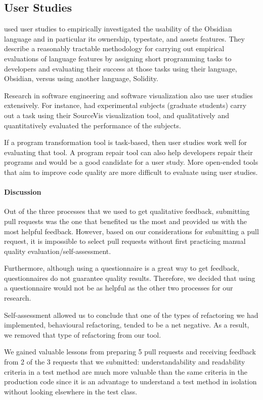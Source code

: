 \subsection{User Studies}
 used user studies to empirically
investigated the usability of the Obsidian language and in particular
its ownership, typestate, and assets features. They describe a
reasonably tractable methodology for carrying out empirical
evaluations of language features by assigning short programming tasks
to developers and evaluating their success at those tasks using their
language, Obsidian, versus using another language, Solidity.

Research in software engineering and software visualization also use
user studies extensively.  For instance,  had
experimental subjects (graduate students) carry out a task using their
SourceVis visualization tool, and qualitatively and quantitatively
evaluated the performance of the subjects.

If a program transformation tool is task-based, then user studies work
well for evaluating that tool. A program repair tool can also help developers
repair their programs and would be a good candidate for a user study.
More open-ended tools that aim to improve code quality are more difficult
to evaluate using user studies.

\paragraph{Discussion}
Out of the three processes that we used to get qualitative feedback, submitting pull requests was the one that benefited us the most and provided us with the most helpful feedback. However, based on our considerations for submitting a pull request, it is impossible to select pull requests without first practicing manual quality evaluation/self-assessment.

Furthermore, although using a questionnaire is a great way to get feedback, questionnaires do not guarantee quality results. Therefore, we decided that using a questionnaire would not be as helpful as the other two processes for our research.

Self-assessment allowed us to conclude that one of the types of refactoring we had implemented, behavioural refactoring, tended to be a net negative. As a result, we removed that type of refactoring from our tool.

We gained valuable lessons from preparing 5 pull requests and receiving feedback from 2 of the 3 requests that we submitted: understandability and readability criteria in a test method are much more valuable than the same criteria in the production code since it is an advantage to understand a test method in isolation without looking elsewhere in the test class. 

